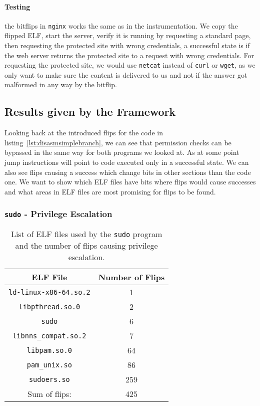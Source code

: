 \paragraph{Testing} the bitflips in \texttt{nginx} works the same as in the
instrumentation. We copy the flipped ELF, start the server, verify it is running
by requesting a standard page, then requesting the protected site with wrong
credentials, a successful state is if the web server returns the protected site
to a request with wrong credentials. For requesting the protected site, we would
use \texttt{netcat} instead of \texttt{curl} or \texttt{wget}, as we only want
to make sure the content is delivered to us and not if the answer got malformed
in any way by the bitflip.

\subsection{Results given by the Framework}

Looking back at the introduced flips for the code in
listing~\ref{lst:disasmsimplebranch}, we can see that permission checks can be
bypassed in the same way for both programs we looked at. As at some point jump
instructions will point to code executed only in a successful state. We can also
see flips causing a success which change bits in other sections than the code
one. We want to show which ELF files have bits where flips would cause
successes and what areas in ELF files are most promising for flips to be found.

\subsubsection{\texttt{sudo} - Privilege Escalation}

\begin{table}[]
\centering
\begin{tabular}{c|c}
ELF File               & Number of Flips \\ \hline
\texttt{ld-linux-x86-64.so.2} & 1               \\
\texttt{libpthread.so.0}      & 2               \\
\texttt{sudo}                 & 6               \\
\texttt{libnns\_compat.so.2}  & 7               \\
\texttt{libpam.so.0}          & 64              \\
\texttt{pam\_unix.so}         & 86              \\
\texttt{sudoers.so}           & 259      \\ \hline
Sum of flips:                 & 425
\end{tabular}
\caption{List of ELF files used by the \texttt{sudo} program and the number of
flips causing privilege escalation.}
\label{tab:sudores}
\end{table}


